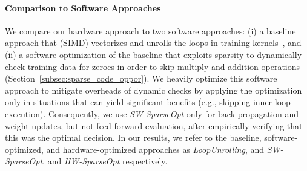 \paragraph{Comparison to Software Approaches}
We compare our hardware approach to two software approaches: (i) a baseline approach that (SIMD) vectorizes and unrolls the loops in training kernels~\cite{Vanhoucke11}, and (ii) a software optimization of the baseline that exploits sparsity to dynamically check training data for zeroes in order to skip multiply and addition operations (Section~\ref{subsec:sparse_code_oppor}).  We heavily optimize this software approach to mitigate overheads of dynamic checks by applying the optimization only in situations that can yield significant benefits (e.g., skipping inner loop execution).  Consequently, we use {\it SW-SparseOpt} only for back-propagation and weight updates, but not feed-forward evaluation, after empirically verifying that this was the optimal decision.  In our results, we refer to the baseline, software-optimized, and hardware-optimized approaches as \emph{LoopUnrolling}, and \emph{SW-SparseOpt}, and \emph{HW-SparseOpt} respectively. 



